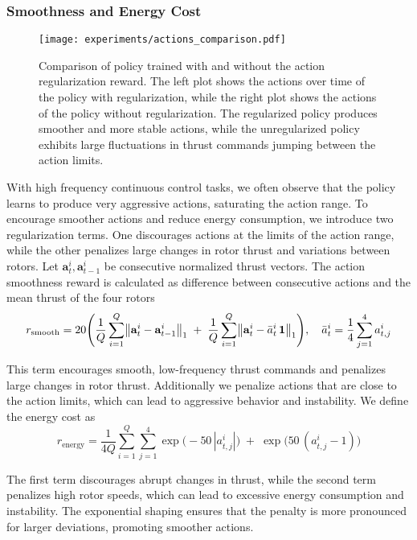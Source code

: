 \subsubsection{Smoothness and Energy Cost}
\begin{figure}[ht]
    \centering
    \texttt{[image: experiments/actions\_comparison.pdf]}
    \caption[Action Regularization]{Comparison of policy trained with and without the action regularization reward. The left plot shows the actions over time of the policy with regularization, while the right plot shows the actions of the policy without regularization. The regularized policy produces smoother and more stable actions, while the unregularized policy exhibits large fluctuations in thrust commands jumping between the action limits.}
    \label{fig:actions_comparison}  
\end{figure}
With high frequency continuous control tasks, we often observe that the policy learns to produce very aggressive actions, saturating the action range. To encourage smoother actions and reduce energy consumption, we introduce two regularization terms. One discourages actions at the limits of the action range, while the other penalizes large changes in rotor thrust and variations between rotors. Let \(\mathbf{a}_t^i,\mathbf{a}_{t-1}^i\) be consecutive normalized thrust vectors. The action smoothness reward is calculated as difference between consecutive actions and the mean thrust of the four rotors
\begin{equation}
r_{\rm smooth} = 20
\Biggl(
\frac{1}{Q}\sum_{i=1}^Q \bigl\lVert \mathbf{a}_t^i - \mathbf{a}_{t-1}^i \bigr\rVert_1
\;+\;
\frac{1}{Q}\sum_{i=1}^Q \bigl\lVert \mathbf{a}_t^i - \bar a_t^i\,\mathbf{1}\bigr\rVert_1
\Biggr), \quad \bar a_t^i = \frac{1}{4}\sum_{j=1}^4 a_{t,j}^i
\end{equation}

This term encourages smooth, low-frequency thrust commands and penalizes large changes in rotor thrust. Additionally we penalize actions that are close to the action limits, which can lead to aggressive behavior and instability. We define the energy cost as
\begin{equation}
r_{\mathrm{energy}} = \frac{1}{4Q}
\sum_{i=1}^{Q}\sum_{j=1}^{4}\exp\bigl(-50\,|a_{t,j}^i|\bigr)\;+\;\exp\bigl(50\,(a_{t,j}^i-1)\bigr)
\end{equation}

The first term discourages abrupt changes in thrust, while the second term penalizes high rotor speeds, which can lead to excessive energy consumption and instability. The exponential shaping ensures that the penalty is more pronounced for larger deviations, promoting smoother actions. 

